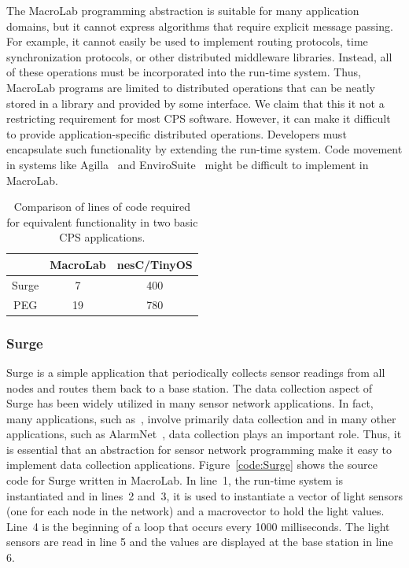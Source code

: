 The MacroLab programming abstraction is suitable for many application
domains, but it cannot express algorithms that require explicit
message passing. For example, it cannot
easily be used to implement
routing protocols, time synchronization protocols, or other
distributed middleware libraries.  Instead, all of these operations must be
incorporated into the run-time system. Thus, MacroLab programs are 
limited to distributed operations that can be neatly stored in a
library and provided by some interface. We claim that this it not
a restricting requirement for most CPS software. However, it
can make it difficult to provide application-specific distributed
operations. Developers must encapsulate such functionality by extending 
the run-time system. Code movement 
in systems like Agilla~\cite{Fok} and EnviroSuite~\cite{Luo} might be
difficult to implement in MacroLab.

\begin{table}
\centering
\begin{minipage}{\columnwidth}
\centering
\begin{tabular}{|c|c|c|}
\cline{2-3}
\multicolumn{1}{c|}{}&MacroLab&nesC/TinyOS\\
\hline
Surge&7&400\\
\hline
PEG&19&780\\
\hline
\end{tabular}
\end{minipage}
\smallskip
\caption[Lines of code comparison]{Comparison of lines of code required for equivalent
functionality in two basic CPS applications.}
\label{table:LOC}
\end{table}

\subsubsection{Surge}\label{sect:surge}

Surge is a simple application that periodically collects sensor readings from
all nodes and routes them back to a base station.  The data collection aspect of
Surge has been widely utilized in many sensor network applications. In fact,
many applications, such as~\cite{Mainwaring,Juang,Selavo}, involve primarily
data collection and in many other applications, such as AlarmNet~\cite{Wood},
data collection plays an important role. Thus, it is essential that an
abstraction for sensor network programming make it easy to implement data
collection applications.  Figure~\ref{code:Surge} shows the source code for
Surge written in MacroLab.  In line~1, the run-time system is instantiated and
in lines~2 and~3, it is used to instantiate a vector of light sensors (one for
each node in the network) and a macrovector to hold the light values.  Line~4 is
the beginning of a loop that occurs every 1000 milliseconds.  The light sensors
are read in line 5 and the values are displayed at the base station in line 6.


